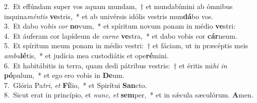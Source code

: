 {2.~}Et effúndam super vos aquam mundam,~† et mundabímini ab ómnibus inquina\textit{mén}\textit{tis} \textbf{ve}stris,~* et ab univérsis idólis vestris mun\textbf{dá}bo vos.\\
{3.~}Et dabo vo\textit{bis} \textit{cor} \textbf{no}vum,~* et spíritum novum ponam in médio \textbf{ve}stri:\\
{4.~}Et áuferam cor lapídeum de \textit{car}\textit{ne} \textbf{ve}stra,~* et dabo vobis cor \textbf{cár}neum.\\
{5.~}Et spíritum meum ponam in médio vestri:~† et fáciam, ut in præcéptis meis \textit{am}\textit{bu}\textbf{lé}tis,~* et judícia mea custodiátis et ope\textbf{ré}mini.\\
{6.~}Et habitábitis in terra, quam dedi pátribus vestris:~† et éritis mi\textit{hi} \textit{in} \textbf{pó}pulum,~* et ego ero vobis in \textbf{De}um.\\
{7.~}Glória Pa\textit{tri}, \textit{et} \textbf{Fí}lio,~* et Spirítui \textbf{San}cto.\\
{8.~}Sicut erat in princípio, et \textit{nunc}, \textit{et} \textbf{sem}per,~* et in sǽcula sæculórum. \textbf{A}men.\\
